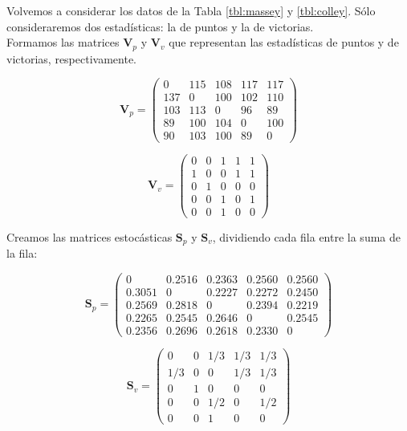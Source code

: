 \begin{ejemplo}\label{ej:markov}
Volvemos a considerar los datos de la Tabla \ref{tbl:massey} y \ref{tbl:colley}. Sólo consideraremos dos estadísticas: la de puntos y la de victorias.\\

Formamos las matrices $\mathbf{V}_p$ y $\mathbf{V}_v$ que representan las estadísticas de puntos y de victorias, respectivamente.

\[ \mathbf{V}_p = \left(\begin{array}{rrrrr}
0   & 115 & 108 & 117 & 117\\
137 & 0   & 100 & 102 & 110\\
103 & 113 & 0   & 96  & 89 \\
89  & 100 & 104 & 0   & 100\\
90  & 103 & 100 & 89  & 0
\end{array}\right) \]

\[ \mathbf{V}_v = \left(\begin{array}{rrrrr}
0 & 0 & 1 & 1 & 1\\
1 & 0 & 0 & 1 & 1\\
0 & 1 & 0 & 0 & 0\\
0 & 0 & 1 & 0 & 1\\
0 & 0 & 1 & 0 & 0
\end{array}\right) \]

Creamos las matrices estocásticas $\mathbf{S}_p$ y $\mathbf{S}_v$, dividiendo cada fila entre la suma de la fila:

\[ \mathbf{S}_p = \left(\begin{array}{rrrrr}
0      & 0.2516 & 0.2363 & 0.2560 & 0.2560 \\
0.3051 & 0      & 0.2227 & 0.2272 & 0.2450 \\
0.2569 & 0.2818 & 0      & 0.2394 & 0.2219 \\
0.2265 & 0.2545 & 0.2646 & 0      & 0.2545 \\
0.2356 & 0.2696 & 0.2618 & 0.2330 & 0
\end{array}\right) \]

\[ \mathbf{S}_v = \left(\begin{array}{rrrrr}
0     & 0   & 1/3 & 1/3 & 1/3\\
1/3   & 0   & 0   & 1/3 & 1/3\\
0     & 1   & 0   & 0   & 0  \\
0     & 0   & 1/2 & 0   & 1/2\\
0     & 0   & 1   & 0   & 0
\end{array}\right) \]


\end{ejemplo}
